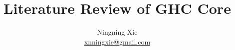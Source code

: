 \documentclass{article}
\begin{document}
\title{Literature Review of GHC Core}
\author{Ningning Xie \\ \href{mailto:xnningxie@gmail.com}{xnningxie@gmail.com}}

\maketitle











\end{document}
